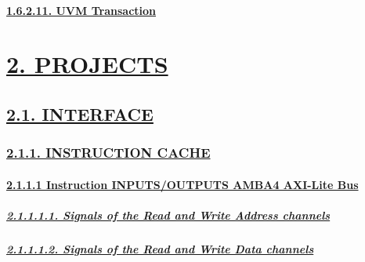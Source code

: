 \documentclass[
]{article}
\begin{document}
\hypertarget{uvm-transaction}{%
\paragraph{\texorpdfstring{\protect\hyperlink{uvm-transaction-1}{1.6.2.11.
UVM Transaction}}{1.6.2.11. UVM Transaction}}\label{uvm-transaction}}

\hypertarget{projects}{%
\section{\texorpdfstring{\protect\hyperlink{projects-1}{2.
PROJECTS}}{2. PROJECTS}}\label{projects}}

\hypertarget{interface}{%
\subsection{\texorpdfstring{\protect\hyperlink{interface-1}{2.1.
INTERFACE}}{2.1. INTERFACE}}\label{interface}}

\hypertarget{instruction-cache}{%
\subsubsection{\texorpdfstring{\protect\hyperlink{instruction-cache-1}{2.1.1.
INSTRUCTION CACHE}}{2.1.1. INSTRUCTION CACHE}}\label{instruction-cache}}

\hypertarget{instruction-inputsoutputs-amba4-axi-lite-bus}{%
\paragraph{\texorpdfstring{\protect\hyperlink{instruction-inputsoutputs-amba4-axi-lite-bus-1}{2.1.1.1
Instruction INPUTS/OUTPUTS AMBA4 AXI-Lite
Bus}}{2.1.1.1 Instruction INPUTS/OUTPUTS AMBA4 AXI-Lite Bus}}\label{instruction-inputsoutputs-amba4-axi-lite-bus}}

\hypertarget{signals-of-the-read-and-write-address-channels}{%
\subparagraph{\texorpdfstring{\protect\hyperlink{signals-of-the-read-and-write-address-channels-2}{2.1.1.1.1.
Signals of the Read and Write Address
channels}}{2.1.1.1.1. Signals of the Read and Write Address channels}}\label{signals-of-the-read-and-write-address-channels}}

\hypertarget{signals-of-the-read-and-write-data-channels}{%
\subparagraph{\texorpdfstring{\protect\hyperlink{signals-of-the-read-and-write-data-channels-2}{2.1.1.1.2.
Signals of the Read and Write Data
channels}}{2.1.1.1.2. Signals of the Read and Write Data channels}}\label{signals-of-the-read-and-write-data-channels}}
\end{document}
